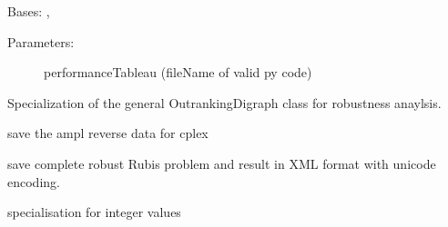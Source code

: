 \documentclass[letterpaper,10pt,english]{sphinxmanual}
\begin{document}

\begin{fulllineitems}
\label{techDoc:outrankingDigraphs.RobustOutrankingDigraph}
Bases: {\hyperref[techDoc:outrankingDigraphs.BipolarOutrankingDigraph]{\emph{}}}, {\hyperref[techDoc:perfTabs.PerformanceTableau]{\emph{}}}
\begin{description}
\item[{Parameters:}] \leavevmode
performanceTableau (fileName of valid py code)

\end{description}

Specialization of the general OutrankingDigraph class for 
robustness anaylsis.

\begin{fulllineitems}
\label{techDoc:outrankingDigraphs.RobustOutrankingDigraph.saveAMPLDataFile}
save the ampl reverse data for cplex

\end{fulllineitems}


\begin{fulllineitems}
\label{techDoc:outrankingDigraphs.RobustOutrankingDigraph.saveXMLRubisOutrankingDigraph}
save complete robust Rubis problem and result in XML format with unicode encoding.

\end{fulllineitems}


\begin{fulllineitems}
\label{techDoc:outrankingDigraphs.RobustOutrankingDigraph.showRelationTable}
specialisation for integer values

\end{fulllineitems}


\end{fulllineitems}
\end{document}
